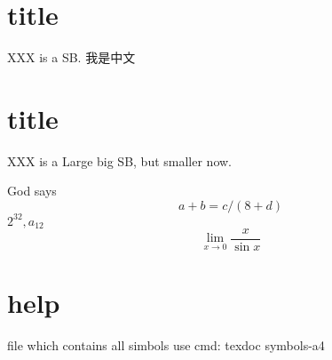\documentclass{article}
\begin{document}
\tableofcontents
\newpage
\section{ title }
XXX is a SB. 我是中文
\section{ title }
XXX is a {Large big SB}, but smaller now.

God says \begin{equation}a+b=c/(8+d)\end{equation}
$2^{32}, a_{12}$
\[
\lim_{x\to0}\frac{x}{\sin x}
\]
\section{ help }
file which contains all simbols use cmd: texdoc symbols-a4
\end{document}
